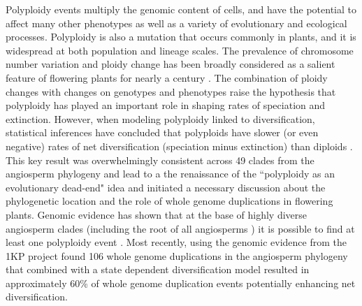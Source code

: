 Polyploidy events multiply the genomic content of cells, and have the potential to affect many other phenotypes as well  as a variety of evolutionary \citep{ramsey_2002} and ecological processes\citep{sessa_2019}.
Polyploidy is also a mutation that occurs commonly in plants, and it is widespread at both population and lineage scales\citep{husband_2013, zenilferguson_2017}.
The prevalence of chromosome number variation and ploidy change has been broadly considered as a salient feature of flowering plants for nearly a century \citep{stebbins1938}. %
The combination of ploidy changes with changes on genotypes and phenotypes raise the hypothesis that polyploidy has played an important role in shaping rates of speciation and extinction.
However, when modeling polyploidy linked to diversification, statistical inferences have concluded that polyploids have slower (or even negative) rates of net diversification (speciation minus extinction) than diploids \citet{mayrose_2011, mayrose_2015}. This key result was overwhelmingly consistent across 49 clades from the angiosperm phylogeny and lead to a the renaissance of the ``polyploidy as an evolutionary dead-end" idea and initiated a necessary discussion about the phylogenetic location and the role of whole genome duplications in flowering plants. 
Genomic evidence has shown that at the base of highly diverse  angiosperm clades (including  the root of all angiosperms \citep{jiao_2011}) it is possible to find at least one polyploidy event  \citet{soltis_2014}. Most recently, using the genomic evidence  from the 1KP project \citep{landis_2018} found 106  whole genome duplications in the angiosperm phylogeny that combined with a state dependent diversification model resulted in approximately 60\%  of  whole genome duplication events potentially enhancing net diversification\citep{landis_2018}. %
